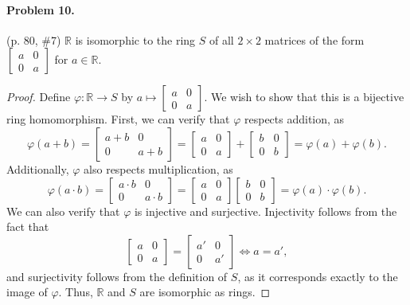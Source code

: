 \documentclass[12pt]{article}
\begin{document}
\paragraph{Problem 10.} (p. 80, \#7)
$\mathbb R$ is isomorphic to the ring $S$ of all $2 \times 2$ matrices of the form $\begin{bmatrix} a & 0 \\ 0 & a \end{bmatrix}$ for $a \in \mathbb R$.

\begin{proof}
    Define $\varphi : \mathbb R \to S$ by $a \mapsto \begin{bmatrix} a & 0 \\ 0 & a \end{bmatrix}$. We wish to show that this is a bijective ring homomorphism. First, we can verify that $\varphi$ respects addition, as 
    \[ \varphi(a + b) = \begin{bmatrix} a + b & 0 \\ 0 & a + b \end{bmatrix} = \begin{bmatrix} a & 0 \\ 0 & a \end{bmatrix} + \begin{bmatrix} b & 0 \\ 0 & b \end{bmatrix} = \varphi(a) + \varphi(b). \]
    Additionally, $\varphi$ also respects multiplication, as
    \[ \varphi(a \cdot b) = \begin{bmatrix} a \cdot b & 0 \\ 0 & a \cdot b \end{bmatrix} = \begin{bmatrix} a & 0 \\ 0 & a \end{bmatrix} \begin{bmatrix} b & 0 \\ 0 & b \end{bmatrix} = \varphi(a) \cdot \varphi(b). \]
    We can also verify that $\varphi$ is injective and surjective. Injectivity follows from the fact that \[\begin{bmatrix} a & 0 \\ 0 & a \end{bmatrix} = \begin{bmatrix} a' & 0 \\ 0 & a' \end{bmatrix} \iff a = a', \]
    and surjectivity follows from the definition of $S$, as it corresponds exactly to the image of $\varphi$. Thus, $\mathbb R$ and $S$ are isomorphic as rings.
\end{proof}
\end{document}
